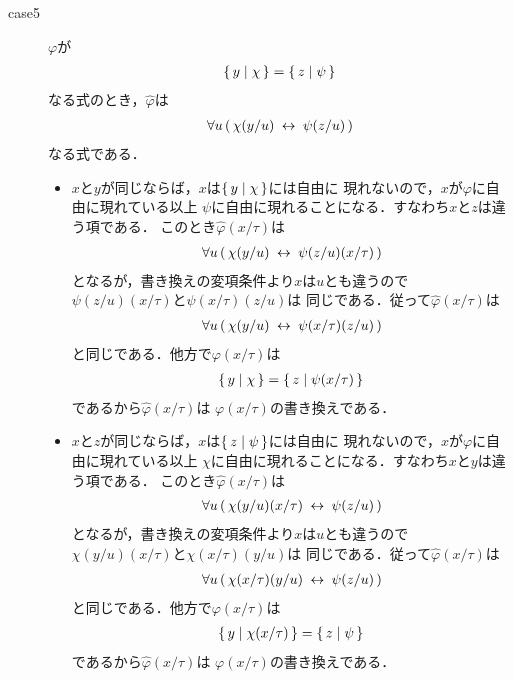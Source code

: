 \begin{metaprf}
\begin{description}
\begin{description}
					\item[case5] $\varphi$が
						\begin{align}
							\{\, y \mid \chi\, \} = \{\, z \mid \psi\, \}
						\end{align}
						なる式のとき，$\widehat{\varphi}$は
						\begin{align}
							\forall u\, (\, \chi(y/u) \hspace{0.25em}\leftrightarrow\hspace{0.25em} \psi(z/u)\, )
						\end{align}
						なる式である．
						\begin{itemize}
							\item $x$と$y$が同じならば，$x$は$\{\, y \mid \chi\, \}$には自由に
								現れないので，$x$が$\varphi$に自由に現れている以上
								$\psi$に自由に現れることになる．すなわち$x$と$z$は違う項である．
								このとき$\widehat{\varphi}(x/\tau)$は
								\begin{align}
									\forall u\, (\, \chi(y/u) \hspace{0.25em}\leftrightarrow\hspace{0.25em} \psi(z/u)(x/\tau)\, )
								\end{align}
								となるが，書き換えの変項条件より$x$は$u$とも違うので
								$\psi(z/u)(x/\tau)$と$\psi(x/\tau)(z/u)$は
								同じである．従って$\widehat{\varphi}(x/\tau)$は
								\begin{align}
									\forall u\, (\, \chi(y/u) \hspace{0.25em}\leftrightarrow\hspace{0.25em} \psi(x/\tau)(z/u)\, )
								\end{align}
								と同じである．他方で$\varphi(x/\tau)$は
								\begin{align}
									\{\, y \mid \chi\, \} = \{\, z \mid \psi(x/\tau)\, \}
								\end{align}
								であるから$\widehat{\varphi}(x/\tau)$は
								$\varphi(x/\tau)$の書き換えである．
								
							\item $x$と$z$が同じならば，$x$は$\{\, z \mid \psi\, \}$には自由に
								現れないので，$x$が$\varphi$に自由に現れている以上
								$\chi$に自由に現れることになる．すなわち$x$と$y$は違う項である．
								このとき$\widehat{\varphi}(x/\tau)$は
								\begin{align}
									\forall u\, (\, \chi(y/u)(x/\tau) \hspace{0.25em}\leftrightarrow\hspace{0.25em} \psi(z/u)\, )
								\end{align}
								となるが，書き換えの変項条件より$x$は$u$とも違うので
								$\chi(y/u)(x/\tau)$と$\chi(x/\tau)(y/u)$は
								同じである．従って$\widehat{\varphi}(x/\tau)$は
								\begin{align}
									\forall u\, (\, \chi(x/\tau)(y/u) \hspace{0.25em}\leftrightarrow\hspace{0.25em} \psi(z/u)\, )
								\end{align}
								と同じである．他方で$\varphi(x/\tau)$は
								\begin{align}
									\{\, y \mid \chi(x/\tau)\, \} = \{\, z \mid \psi\, \}
								\end{align}
								であるから$\widehat{\varphi}(x/\tau)$は
								$\varphi(x/\tau)$の書き換えである．
							

\end{itemize}
\end{description}
\end{description}
\end{metaprf}
